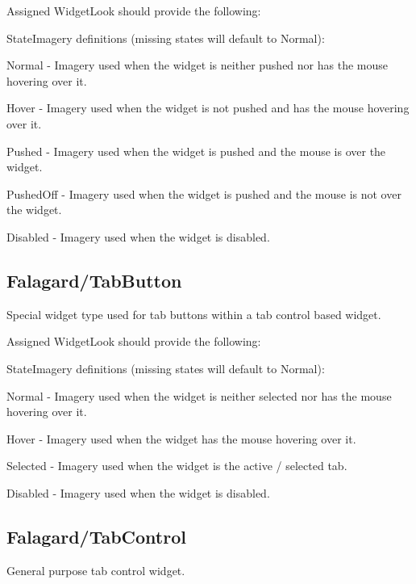 Assigned Widget\+Look should provide the following\+: 
\begin{DoxyItemize}
\item State\+Imagery definitions (missing states will default to \textquotesingle{}Normal\textquotesingle{})\+: 
\begin{DoxyItemize}
\item Normal -\/ Imagery used when the widget is neither pushed nor has the mouse hovering over it. 
\item Hover -\/ Imagery used when the widget is not pushed and has the mouse hovering over it. 
\item Pushed -\/ Imagery used when the widget is pushed and the mouse is over the widget. 
\item Pushed\+Off -\/ Imagery used when the widget is pushed and the mouse is not over the widget. 
\item Disabled -\/ Imagery used when the widget is disabled. 
\end{DoxyItemize}
\end{DoxyItemize}\hypertarget{fal_wr_ref_fal_wr_ref_sec_24}{}\subsection{Falagard/\+Tab\+Button}\label{fal_wr_ref_fal_wr_ref_sec_24}
Special widget type used for tab buttons within a tab control based widget.

Assigned Widget\+Look should provide the following\+: 
\begin{DoxyItemize}
\item State\+Imagery definitions (missing states will default to \textquotesingle{}Normal\textquotesingle{})\+: 
\begin{DoxyItemize}
\item Normal -\/ Imagery used when the widget is neither selected nor has the mouse hovering over it. 
\item Hover -\/ Imagery used when the widget has the mouse hovering over it. 
\item Selected -\/ Imagery used when the widget is the active / selected tab. 
\item Disabled -\/ Imagery used when the widget is disabled. 
\end{DoxyItemize}
\end{DoxyItemize}\hypertarget{fal_wr_ref_fal_wr_ref_sec_25}{}\subsection{Falagard/\+Tab\+Control}\label{fal_wr_ref_fal_wr_ref_sec_25}
General purpose tab control widget.

